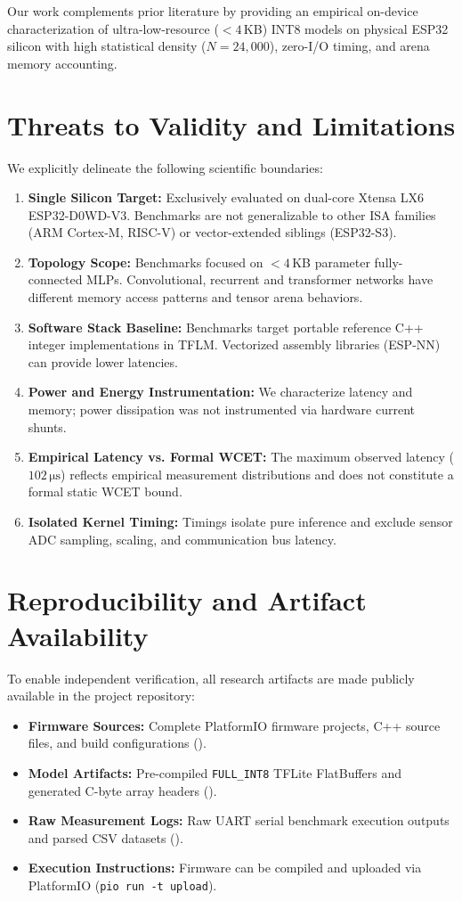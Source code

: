 \documentclass[journal,10pt]{IEEEtran}
\begin{document}
Our work complements prior literature by providing an empirical on-device characterization of ultra-low-resource ($<4$\,KB) INT8 models on physical ESP32 silicon with high statistical density ($N=24,000$), zero-I/O timing, and arena memory accounting.

\section{Threats to Validity and Limitations}
We explicitly delineate the following scientific boundaries:
\begin{enumerate}
    \item \textbf{Single Silicon Target:} Exclusively evaluated on dual-core Xtensa LX6 ESP32-D0WD-V3. Benchmarks are not generalizable to other ISA families (ARM Cortex-M, RISC-V) or vector-extended siblings (ESP32-S3).
    \item \textbf{Topology Scope:} Benchmarks focused on $<4$\,KB parameter fully-connected MLPs. Convolutional, recurrent and transformer networks have different memory access patterns and tensor arena behaviors.
    \item \textbf{Software Stack Baseline:} Benchmarks target portable reference C++ integer implementations in TFLM. Vectorized assembly libraries (ESP-NN) can provide lower latencies.
    \item \textbf{Power and Energy Instrumentation:} We characterize latency and memory; power dissipation was not instrumented via hardware current shunts.
    \item \textbf{Empirical Latency vs. Formal WCET:} The maximum observed latency ($102\,\si{\micro\second}$) reflects empirical measurement distributions and does not constitute a formal static WCET bound.
    \item \textbf{Isolated Kernel Timing:} Timings isolate pure inference and exclude sensor ADC sampling, scaling, and communication bus latency.
\end{enumerate}

\section{Reproducibility and Artifact Availability}
To enable independent verification, all research artifacts are made publicly available in the project repository:
\begin{itemize}
    \item \textbf{Firmware Sources:} Complete PlatformIO firmware projects, C++ source files, and build configurations ().
    \item \textbf{Model Artifacts:} Pre-compiled \texttt{FULL\_INT8} TFLite FlatBuffers and generated C-byte array headers ().
    \item \textbf{Raw Measurement Logs:} Raw UART serial benchmark execution outputs and parsed CSV datasets ().
    \item \textbf{Execution Instructions:} Firmware can be compiled and uploaded via PlatformIO (\texttt{pio run -t upload}).
\end{itemize}
\end{document}
